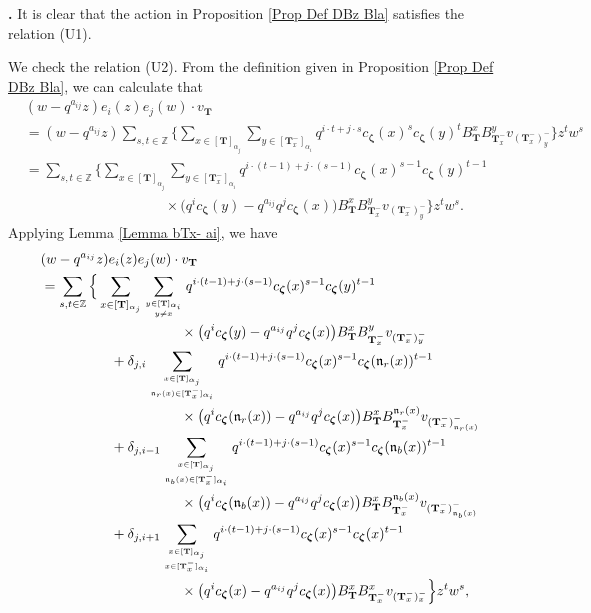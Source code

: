 \documentclass[12pt]{amsart}
\def \para{\refstepcounter{thm} \par\medskip\noindent
                \textbf{\thethm .} }
\numberwithin{equation}{thm}
\newcommand\ZZ{\mathbb Z}
\newcommand\bT{\mathbf T}
\newcommand\fn{\mathfrak n}
\renewcommand\a{\alpha}  %
\renewcommand\d{\delta}  %
\newcommand\Bz{\boldsymbol\zeta}
\newcounter{ni}
\begin{document}
\para  
It is clear that the action in Proposition \ref{Prop Def DBz Bla} satisfies the relation (U1).  

We check the relation (U2).  
From the definition given in Proposition \ref{Prop Def DBz Bla}, 
we can calculate that 
\begin{align*}
&(w- q^{a_{ij}} z) e_i(z) e_j(w) \cdot v_{\bT} 
\\
&= (w - q^{a_{ij}} z) \sum_{s,t \in \ZZ} \Big\{ 
	\sum_{x \in [\bT]_{\a_j}} \sum_{y \in [\bT_x^-]_{\a_i}} 
		q^{i \cdot t + j \cdot s} c_{\Bz} (x)^s c_{\Bz} (y)^t B_{\bT}^x B_{\bT_x^-}^y v_{(\bT_x^-)_y^-} \Big\} z^t w^s 
\\
&= \sum_{s,t \in \ZZ} 
	\Big\{ \sum_{x \in [\bT]_{\a_j}} \sum_{y \in [\bT_x^-]_{\a_i}} 
		q^{i \cdot (t-1) + j \cdot (s-1)} c_{\Bz} (x)^{s-1} c_{\Bz} (y)^{t-1} 
	\\ & \hspace{10em} \times 
	\big( q^i c_{\Bz} (y) - q^{a_{ij}} q^j c_{\Bz} (x) \big) B_{\bT}^x B_{\bT_x^-}^y v_{(\bT_x^-)_y^-} 
	\Big\} z^t w^s. 
\end{align*} 
Applying Lemma \ref{Lemma bTx- ai}, we have 
\begin{align*}
&(w- q^{a_{ij}} z) e_i(z) e_j(w) \cdot v_{\bT} 
\\
&= \sum_{s,t \in \ZZ}  
	\Big\{ \sum_{x \in [\bT]_{\a_j}} \sum_{y \in [\bT]_{\a_i} \atop y \not=x}
		q^{i \cdot (t-1) + j \cdot (s-1)} c_{\Bz} (x)^{s-1} c_{\Bz} (y)^{t-1} 
			\\ & \hspace{10em} \times 
			\big( q^i c_{\Bz} (y) - q^{a_{ij}} q^j c_{\Bz} (x) \big) B_{\bT}^x B_{\bT_x^-}^y v_{(\bT_x^-)_y^-} 
	\\ & \hspace{5em} 
	+ \d_{j,i} \sum_{ x \in [\bT]_{\a_j} \atop \fn_r(x) \in [\bT_x^-]_{\a_i}} 
		q^{i \cdot (t-1) + j \cdot (s-1)} c_{\Bz} (x)^{s-1} c_{\Bz} (\fn_r(x))^{t-1} 
			\\ & \hspace{10em} \times 
			\big( q^i c_{\Bz} (\fn_r(x)) - q^{a_{ij}} q^j c_{\Bz} (x) \big) B_{\bT}^x B_{\bT_x^-}^{\fn_r(x)} v_{(\bT_x^-)_{\fn_r(x)}^-} 
	\\ & \hspace{5em} 
	+ \d_{j, i-1} \sum_{x \in [\bT]_{\a_j} \atop \fn_b(x) \in [\bT_x^-]_{\a_i}}
		q^{i \cdot (t-1) + j \cdot (s-1)} c_{\Bz} (x)^{s-1} c_{\Bz} (\fn_b(x))^{t-1} 
			\\ & \hspace{10em} \times 
			\big( q^i c_{\Bz} (\fn_b(x)) - q^{a_{ij}} q^j c_{\Bz} (x) \big) B_{\bT}^x B_{\bT_x^-}^{\fn_b(x)} v_{(\bT_x^-)_{\fn_b(x)}^-} 
	\\ & \hspace{5em} 
	+ \d_{ j, i+1} \sum_{x \in [\bT]_{\a_j} \atop x \in [\bT_x^-]_{\a_i}} 
		q^{i \cdot (t-1) + j \cdot (s-1)} c_{\Bz} (x)^{s-1} c_{\Bz} (x)^{t-1} 
			\\ & \hspace{10em} \times 
			\big( q^i c_{\Bz} (x) - q^{a_{ij}} q^j c_{\Bz} (x) \big) B_{\bT}^x B_{\bT_x^-}^x v_{(\bT_x^-)_x^-} 
	\Big\} z^t w^s, 
\end{align*}
\end{document}
